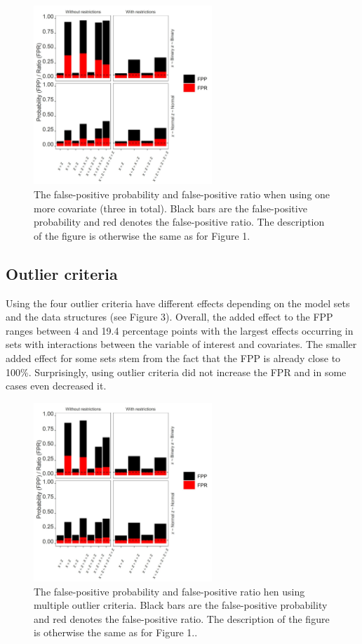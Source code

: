 \begin{figure}[hbt!]
\includegraphics[width=0.6\textwidth]{R/Analysis/Result/Figures/Figure1C.jpeg}
\centering
\caption{The false-positive probability and false-positive ratio when using one more covariate (three in total). Black bars are the false-positive probability and red denotes the false-positive ratio. The description of the figure is otherwise the same as for Figure 1.}
\label{fig:mainfigure}
\end{figure}

\subsection{Outlier criteria}
Using the four outlier criteria have different effects depending on the model sets and the data structures (see Figure 3). Overall, the added effect to the FPP ranges between 4 and 19.4 percentage points with the largest effects occurring in sets with interactions between the variable of interest and covariates. The smaller added effect for some sets stem from the fact that the FPP is already close to 100\%.  Surprisingly, using outlier criteria did not increase the FPR and in some cases even decreased it. 

\begin{figure}[hbt!]
\includegraphics[width=0.6\textwidth]{R/Analysis/Result/Figures/Figure1B.jpeg}
\centering
\caption{The false-positive probability and false-positive ratio hen using multiple outlier criteria. Black bars are the false-positive probability and red denotes the false-positive ratio. The description of the figure is otherwise the same as for Figure 1..}
\label{fig:mainfigure}
\end{figure}

